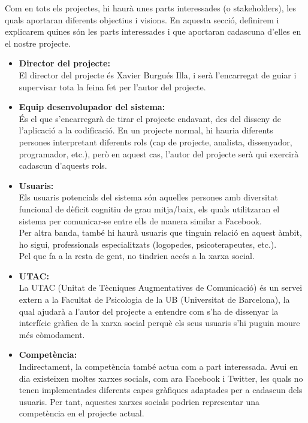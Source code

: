\documentclass[11pt,catalan,listoffigures,listoftables]{tfgetsinf}
\begin{document}
Com en tots els projectes, hi haurà unes parts interessades (o stakeholders), les quals aportaran diferents objectius i visions. En aquesta secció, definirem i explicarem quines són les parts interessades i que aportaran cadascuna d’elles en el nostre projecte.
\begin{itemize}
	\item \textbf{Director del projecte:} \\El director del projecte és Xavier Burgués Illa, i serà l’encarregat de guiar i supervisar tota la feina fet per l’autor del projecte.
	\item \textbf{Equip desenvolupador del sistema:} \\És el que s’encarregarà de tirar el projecte endavant, des del disseny de l’aplicació a la codificació. En un projecte normal, hi hauria diferents persones interpretant diferents rols (cap de projecte, analista, dissenyador, programador, etc.), però en aquest cas, l’autor del projecte serà qui exercirà cadascun d’aquests rols.
	\item \textbf{Usuaris:} \\ Els usuaris potencials del sistema són aquelles persones amb diversitat funcional de dèficit cognitiu de grau mitja/baix, els quals utilitzaran el sistema per comunicar-se entre ells de manera similar a Facebook. \\Per altra banda, també hi haurà usuaris que tinguin relació en aquest àmbit, ho sigui, professionals especialitzats (logopedes, psicoterapeutes, etc.). \\Pel que fa a la resta de gent, no tindrien accés a la xarxa social.
	\item \textbf{UTAC:} \\La UTAC (Unitat de Tècniques Augmentatives de Comunicació) és un servei extern a la Facultat de Psicologia de la UB (Universitat de Barcelona), la qual ajudarà a l’autor del projecte a entendre com s’ha de dissenyar la interfície gràfica de la xarxa social perquè els seus usuaris s’hi puguin moure més còmodament.
	\item \textbf{Competència:}\\Indirectament, la competència també actua com a part interessada. Avui en dia existeixen moltes xarxes socials, com ara Facebook i Twitter, les quals no tenen implementades diferents capes gràfiques adaptades per a cadascun dels usuaris. Per tant, aquestes xarxes socials podrien representar una competència en el projecte actual.
\end{itemize}
\end{document}
